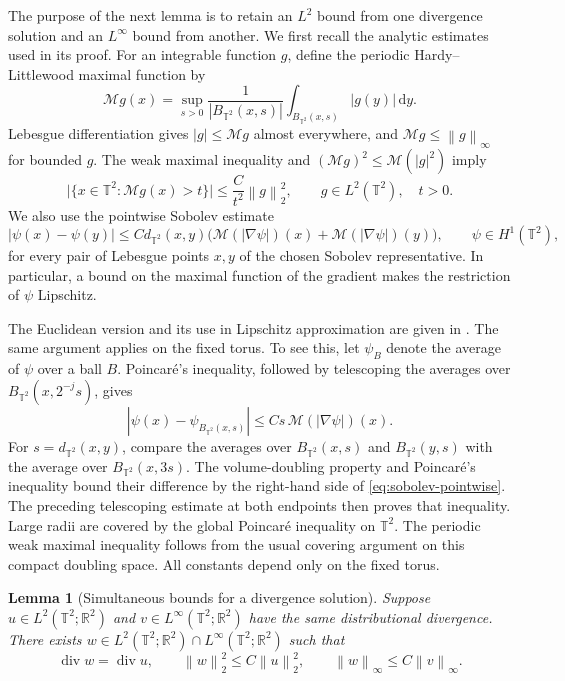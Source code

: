 \documentclass[11pt]{article}
\newcommand{\R}{\mathbb R}
\newcommand{\T}{\mathbb T^2}
\newcommand{\cM}{\mathcal M}
\newcommand{\diver}{\operatorname{div}}
\newcommand{\norm}[1]{\left\lVert #1\right\rVert}
\newcommand{\abs}[1]{\left\lvert #1\right\rvert}
\newtheorem{lemma}[theorem]{Lemma}
\theoremstyle{remark}
\numberwithin{equation}{section}
\begin{document}
The purpose of the next lemma is to retain an \(L^2\) bound from one
divergence solution and an \(L^\infty\) bound from another. We first
recall the analytic estimates used in its proof. For an integrable
function \(g\), define the periodic Hardy--Littlewood maximal function
by
\[
 \cM g(x)=\sup_{s>0}\frac1{|B_{\T}(x,s)|}
                  \int_{B_{\T}(x,s)}|g(y)|\,\mathrm dy.
\]
Lebesgue differentiation gives \(\abs g\le\cM g\) almost everywhere,
and \(\cM g\le\norm g_\infty\) for bounded \(g\). The weak maximal
inequality and \((\cM g)^2\le\cM(|g|^2)\) imply
\[
 \bigl|\{x\in\T:\cM g(x)>t\}\bigr|
 \le \frac{C}{t^2}\norm g_2^2,
 \qquad g\in L^2(\T),\quad t>0.
\]
We also use the pointwise Sobolev estimate
\begin{equation}
\label{eq:sobolev-pointwise}
 |\psi(x)-\psi(y)|
 \le C d_{\T}(x,y)
 \bigl(\cM(|\nabla\psi|)(x)+\cM(|\nabla\psi|)(y)\bigr),
 \qquad \psi\in H^1(\T),
\end{equation}
for every pair of Lebesgue points \(x,y\) of the chosen Sobolev
representative. In particular, a bound on the maximal
function of the gradient makes the restriction of \(\psi\) Lipschitz.

The Euclidean version and its use in Lipschitz approximation are given
in \cite[proof of Lemma~10, p.~236]{Haj00}. The same argument applies
on the fixed torus. To see this, let \(\psi_B\) denote the average of
\(\psi\) over a ball \(B\). Poincar\'e's inequality, followed by
telescoping the averages over \(B_{\T}(x,2^{-j}s)\), gives
\[
 |\psi(x)-\psi_{B_{\T}(x,s)}|
 \le Cs\,\cM(|\nabla\psi|)(x).
\]
For \(s=d_{\T}(x,y)\), compare the averages over
\(B_{\T}(x,s)\) and \(B_{\T}(y,s)\) with the average over
\(B_{\T}(x,3s)\). The volume-doubling property and Poincar\'e's
inequality bound their difference by the right-hand side of
\eqref{eq:sobolev-pointwise}. The preceding telescoping estimate at
both endpoints then proves that inequality. Large radii are covered by
the global Poincar\'e inequality on \(\T\). The periodic weak maximal
inequality follows from the usual covering argument on this compact
doubling space. All constants depend only on the fixed torus.

\begin{lemma}[Simultaneous bounds for a divergence solution]
\label{lem:interpolate}
Suppose \(u\in L^2(\T;\R^2)\) and
\(v\in L^\infty(\T;\R^2)\) have the same distributional divergence.
There exists \(w\in L^2(\T;\R^2)\cap L^\infty(\T;\R^2)\) such
that
\[
 \diver w=\diver u,\qquad
 \norm w_2^2\le C\norm u_2^2,\qquad
 \norm w_\infty\le C\norm v_\infty.
\]
\end{lemma}
\end{document}
